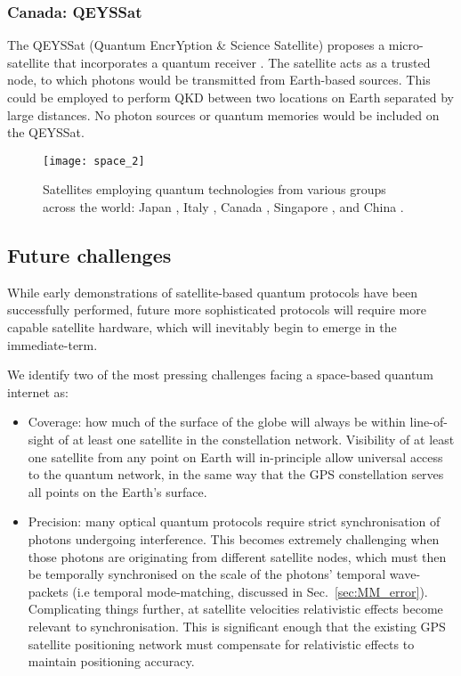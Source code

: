 %
%

\subsubsection{Canada: QEYSSat}

The QEYSSat (Quantum EncrYption \& Science Satellite) proposes a micro-satellite that incorporates a quantum receiver \cite{bib:jennewein2014qeyssat}. The satellite acts as a trusted node, to which photons would be transmitted from Earth-based sources. This could be employed to perform QKD between two locations on Earth separated by large distances. No photon sources or quantum memories would be included on the QEYSSat. 

\begin{figure*}[!htbp]
\texttt{[image: space\_2]}
\captionspacefig \caption{Satellites employing quantum technologies from various groups across the world: Japan \cite{bib:horiuchi2015view}, Italy \cite{bib:vallone15}, Canada \cite{bib:jennewein2014qeyssat}, Singapore \cite{bib:tang2016generation}, and China \cite{bib:N_535_478}. }
\label{fig:space_2}
\end{figure*}

%
%

\subsection{Future challenges}

While early demonstrations of satellite-based quantum protocols have been successfully performed, future more sophisticated protocols will require more capable satellite hardware, which will inevitably begin to emerge in the immediate-term.

We identify two of the most pressing challenges facing a space-based quantum internet as:
\begin{itemize}
\item Coverage: how much of the surface of the globe will always be within line-of-sight of at least one satellite in the constellation network. Visibility of at least one satellite from any point on Earth will in-principle allow universal access to the quantum network, in the same way that the GPS constellation serves all points on the Earth's surface.
\item Precision: many optical quantum protocols require strict synchronisation of photons undergoing interference. This becomes extremely challenging when those photons are originating from different satellite nodes, which must then be temporally synchronised on the scale of the photons' temporal wave-packets (i.e temporal mode-matching, discussed in Sec.~\ref{sec:MM_error}). Complicating things further, at satellite velocities relativistic effects become relevant to synchronisation. This is significant enough that the existing GPS satellite positioning network must compensate for relativistic effects to maintain positioning accuracy.
\end{itemize}

